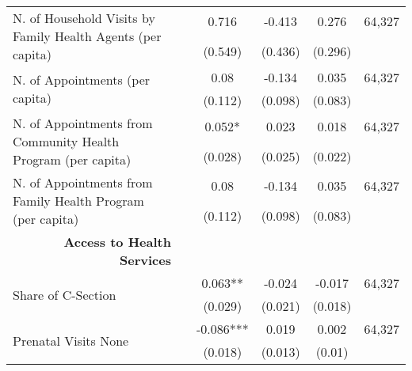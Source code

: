 \begin{table}[H]
\begin{footnotesize}
\begin{center}
{\begin{threeparttable}[b]
\begin{tabular}{rrrrrr}
    \multicolumn{1}{l}{\multirow{2}[0]{*}{N. of Household Visits by Family Health Agents (per capita)}} &       & \multicolumn{1}{c}{0.716} & \multicolumn{1}{c}{-0.413} & \multicolumn{1}{c}{0.276} & \multicolumn{1}{c}{   64,327 } \\
          &       & \multicolumn{1}{c}{(0.549)} & \multicolumn{1}{c}{(0.436)} & \multicolumn{1}{c}{(0.296)} &  \\
    \multicolumn{1}{l}{\multirow{2}[0]{*}{N. of Appointments (per capita)}} &       & \multicolumn{1}{c}{0.08} & \multicolumn{1}{c}{-0.134} & \multicolumn{1}{c}{0.035} & \multicolumn{1}{c}{   64,327 } \\
          &       & \multicolumn{1}{c}{(0.112)} & \multicolumn{1}{c}{(0.098)} & \multicolumn{1}{c}{(0.083)} &  \\
    \multicolumn{1}{l}{\multirow{2}[0]{*}{N. of Appointments from Community Health Program (per capita)}} &       & \multicolumn{1}{c}{0.052*} & \multicolumn{1}{c}{0.023} & \multicolumn{1}{c}{0.018} & \multicolumn{1}{c}{   64,327 } \\
          &       & \multicolumn{1}{c}{(0.028)} & \multicolumn{1}{c}{(0.025)} & \multicolumn{1}{c}{(0.022)} &  \\
    \multicolumn{1}{l}{\multirow{2}[0]{*}{N. of Appointments from Family Health Program (per capita)}} &       & \multicolumn{1}{c}{0.08} & \multicolumn{1}{c}{-0.134} & \multicolumn{1}{c}{0.035} & \multicolumn{1}{c}{   64,327 } \\
          &       & \multicolumn{1}{c}{(0.112)} & \multicolumn{1}{c}{(0.098)} & \multicolumn{1}{c}{(0.083)} &  \\
    \multicolumn{1}{p{19.07em}}{\textbf{Access to Health Services}} &       &       &       &       &  \\
    \multicolumn{1}{l}{\multirow{2}[0]{*}{Share of C-Section}} &       & \multicolumn{1}{c}{0.063**} & \multicolumn{1}{c}{-0.024} & \multicolumn{1}{c}{-0.017} & \multicolumn{1}{c}{   64,327 } \\
          &       & \multicolumn{1}{c}{(0.029)} & \multicolumn{1}{c}{(0.021)} & \multicolumn{1}{c}{(0.018)} &  \\
    \multicolumn{1}{l}{\multirow{2}[0]{*}{Prenatal Visits None}} &       & \multicolumn{1}{c}{-0.086***} & \multicolumn{1}{c}{0.019} & \multicolumn{1}{c}{0.002} & \multicolumn{1}{c}{   64,327 } \\
          &       & \multicolumn{1}{c}{(0.018)} & \multicolumn{1}{c}{(0.013)} & \multicolumn{1}{c}{(0.01)} &  \\

\end{tabular}
\end{threeparttable}}
\end{center}
\end{footnotesize}
\end{table}
